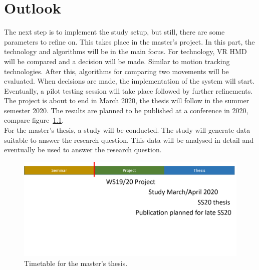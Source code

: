 \chapter{Outlook}
The next step is to implement the study setup, but still, there are some parameters to refine on. This takes place in the master's project. In this part, the technology and algorithms will be in the main focus. For technology, VR HMD will be compared and a decision will be made. Similar to motion tracking technologies. After this, algorithms for comparing two movements will be evaluated. When decisions are made, the implementation of the system will start. Eventually, a pilot testing session will take place followed by further refinements. The project is about to end in March 2020, the thesis will follow in the summer semester 2020. The results are planned to be published at a conference in 2020, compare figure~\ref{fig:outlook}.\\
For the master's thesis, a study will be conducted. The study will generate data suitable to answer the research question. This data will be analysed in detail and eventually be used to answer the research question.

\begin{figure}
	\centering
	\includegraphics[width=1.0\textwidth]{img/outlook.png}
	\caption{Timetable for the master's thesis.}
	\label{fig:outlook}
\end{figure}